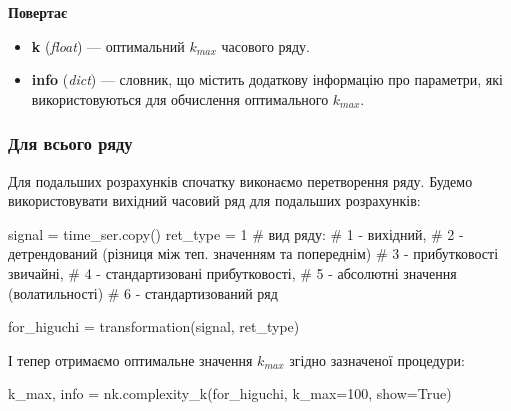 \documentclass[
  letterpaper,
]{report}
\newenvironment{Shaded}{\begin{snugshade}}{\end{snugshade}}
\newcommand{\CommentTok}[1]{\textcolor[rgb]{0.37,0.37,0.37}{#1}}
\newcommand{\DecValTok}[1]{\textcolor[rgb]{0.68,0.00,0.00}{#1}}
\newcommand{\NormalTok}[1]{\textcolor[rgb]{0.00,0.23,0.31}{#1}}
\newcommand{\OperatorTok}[1]{\textcolor[rgb]{0.37,0.37,0.37}{#1}}
\newcommand{\VariableTok}[1]{\textcolor[rgb]{0.07,0.07,0.07}{#1}}
\providecommand{\tightlist}{%
  \setlength{\itemsep}{0pt}\setlength{\parskip}{0pt}}\usepackage{longtable,booktabs,array}
\begin{document}
\textbf{Повертає}

\begin{itemize}
\tightlist
\item
  \textbf{k} (\emph{float}) --- оптимальний \(k_{max}\) часового ряду.
\item
  \textbf{info} (\emph{dict}) --- словник, що містить додаткову
  інформацію про параметри, які використовуються для обчислення
  оптимального \(k_{max}\).
\end{itemize}

\hypertarget{ux434ux43bux44f-ux432ux441ux44cux43eux433ux43e-ux440ux44fux434ux443-1}{%
\subsubsection{Для всього
ряду}\label{ux434ux43bux44f-ux432ux441ux44cux43eux433ux43e-ux440ux44fux434ux443-1}}

Для подальших розрахунків спочатку виконаємо перетворення ряду. Будемо
використовувати вихідний часовий ряд для подальших розрахунків:

\begin{Shaded}
\begin{Highlighting}[]
\NormalTok{signal }\OperatorTok{=}\NormalTok{ time\_ser.copy()}
\NormalTok{ret\_type }\OperatorTok{=} \DecValTok{1}    \CommentTok{\# вид ряду: }
                \CommentTok{\# 1 {-} вихідний, }
                \CommentTok{\# 2 {-} детрендований (різниця між теп. значенням та попереднім)}
                \CommentTok{\# 3 {-} прибутковості звичайні, }
                \CommentTok{\# 4 {-} стандартизовані прибутковості, }
                \CommentTok{\# 5 {-} абсолютні значення (волатильності)}
                \CommentTok{\# 6 {-} стандартизований ряд}

\NormalTok{for\_higuchi }\OperatorTok{=}\NormalTok{ transformation(signal, ret\_type) }
\end{Highlighting}
\end{Shaded}

І тепер отримаємо оптимальне значення \(k_{max}\) згідно зазначеної
процедури:

\begin{Shaded}
\begin{Highlighting}[]
\NormalTok{k\_max, info }\OperatorTok{=}\NormalTok{ nk.complexity\_k(for\_higuchi, k\_max}\OperatorTok{=}\DecValTok{100}\NormalTok{, show}\OperatorTok{=}\VariableTok{True}\NormalTok{)}
\end{Highlighting}
\end{Shaded}
\end{document}
